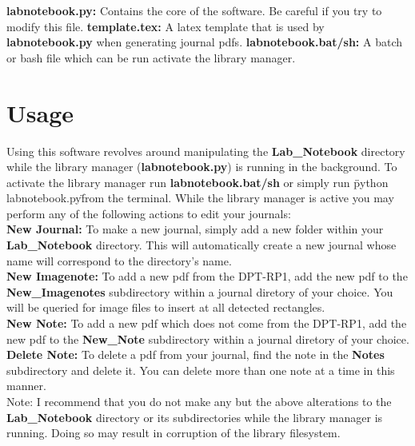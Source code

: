 \documentclass{article}
\begin{document}
\textbf{labnotebook.py:} Contains the core of the software. Be careful if you try to modify this file.
\textbf{template.tex:} A latex template that is used by \textbf{labnotebook.py} when generating journal pdfs.
\textbf{labnotebook.bat/sh:} A batch or bash file which can be run activate the library manager.

\section{Usage}

Using this software revolves around manipulating the \textbf{Lab\_Notebook} directory while the library manager (\textbf{labnotebook.py}) is running in the background. To activate the library manager run \textbf{labnotebook.bat/sh} or simply run \"python labnotebook.py\" from the terminal. While the library manager is active you may perform any of the following actions to edit your journals:\\

\textbf{New Journal:} To make a new journal, simply add a new folder within your \textbf{Lab\_Notebook} directory. This will automatically create a new journal whose name will correspond to the directory's name.\\

\textbf{New Imagenote:} To add a new pdf from the DPT-RP1, add the new pdf to the \textbf{New\_Imagenotes} subdirectory within a journal diretory of your choice. You will be queried for image files to insert at all detected rectangles.\\

\textbf{New Note:} To add a new pdf which does not come from the DPT-RP1, add the new pdf to the \textbf{New\_Note} subdirectory within a journal diretory of your choice.\\

\textbf{Delete Note:} To delete a pdf from your journal, find the note in the \textbf{Notes} subdirectory and delete it. You can delete more than one note at a time in this manner.\\

Note: I recommend that you do not make any but the above alterations to the \textbf{Lab\_Notebook} directory or its subdirectories while the library manager is running. Doing so may result in corruption of the library filesystem.
\end{document}
